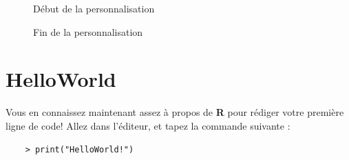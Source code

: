 \documentclass[10.5pt,a4paper]{article}
\begin{document}
\begin{figure}[H]
  \centering
  \caption{Début de la personnalisation}
  \label{rstudio2}
\end{figure}

\begin{figure}[H]
  \centering
  \caption{Fin de la personnalisation}
  \label{rstudio3}
\end{figure}

\section{HelloWorld}

Vous en connaissez maintenant assez à propos de \textbf{R} pour rédiger votre première ligne de code! Allez dans l'éditeur, et tapez la commande suivante :
    \begin{lstlisting}
    > print("HelloWorld!")
    \end{lstlisting}
   
\end{document}
